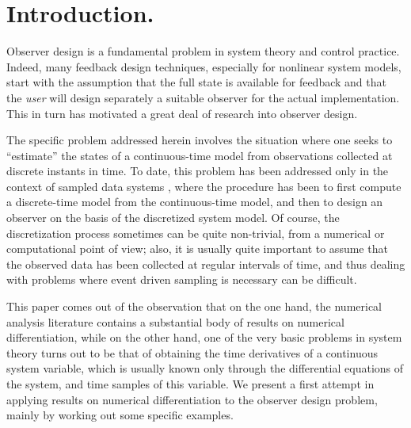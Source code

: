 \section{Introduction.}  Observer design is a fundamental problem in system theory and 
control practice.  Indeed, many feedback  design techniques, especially for nonlinear
system models,  start with the assumption that the full state is available for
feedback and that the {\it user} will design separately a suitable observer
for the actual implementation.  This in turn has motivated a great deal of
research into observer design.   

The specific problem addressed herein involves the situation where
one seeks to ``estimate'' the states of a continuous-time model from
observations collected at discrete instants in time.  To date, this problem has
been addressed only in the context of sampled data systems
\cite{grizzle1990b,grizzle1990a,grizzle1990c,moraal1992}, where the
procedure has been to first compute
a discrete-time model from the continuous-time model, and
then to design an observer on the basis of the discretized system model.
Of course, the discretization process sometimes can be quite non-trivial, from
a numerical or computational point of view; also, it is usually quite important 
to assume that the observed data has been collected at regular intervals of time,
and thus dealing with problems where event driven sampling is necessary can be difficult.  

This paper comes out of the observation that
on the one hand, the numerical analysis literature contains a
substantial body of results on numerical differentiation, while on
the other hand, one of the very basic problems in system theory turns
out to be that of obtaining the time derivatives of a continuous system
variable, which is usually known only through the differential equations of
the system, and time samples of this variable.
We present a first attempt in applying results on numerical differentiation
to the observer design problem, mainly by
working out some specific examples.

